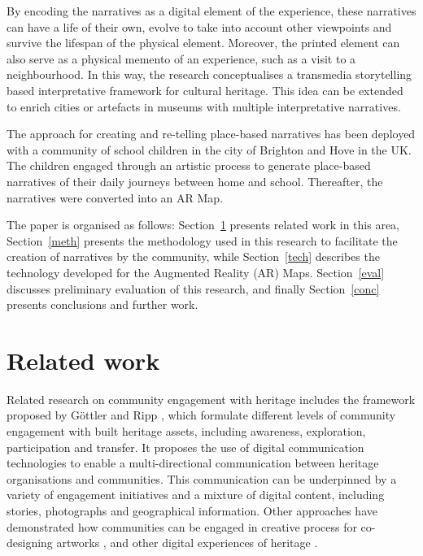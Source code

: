 \documentclass{egpubl}
\begin{document}
By encoding the narratives as a digital element of the experience, these
narratives can have a life of their own, evolve to take into account other
viewpoints and survive the lifespan of the physical element. Moreover, the
printed element can also serve as a physical memento of an experience, such as
a visit to a neighbourhood. In this way, the research conceptualises a
transmedia storytelling based interpretative framework for cultural heritage.
This idea can be extended to enrich cities or artefacts in museums with
multiple interpretative narratives.

The approach for creating and re-telling place-based narratives has been
deployed with a community of school children in the city of Brighton and Hove
in the UK. The children engaged through an artistic process to generate
place-based narratives of their daily journeys between home and school.
Thereafter, the narratives were converted into an AR Map.

The paper is organised as follows: Section~\ref{ref} presents related work in
this area, Section~\ref{meth} presents the methodology used in this research
to facilitate the creation of narratives by the community, while
Section~\ref{tech} describes the technology developed for the Augmented
Reality (AR) Maps. Section~\ref{eval} discusses preliminary evaluation of this
research, and finally Section~\ref{conc} presents conclusions and further
work.


\section{Related work} \label{ref} Related research on community engagement
with heritage includes the framework proposed by G{\"o}ttler and Ripp
\cite{icomos1812}, which formulate different levels of community engagement
with built heritage assets, including awareness, exploration, participation
and transfer. It proposes the use of digital communication technologies to
enable a multi-directional communication between heritage organisations and
communities. This communication can be underpinned by a variety of engagement
initiatives and a mixture of digital content, including stories, photographs
and geographical information. Other approaches have demonstrated how
communities can be engaged in creative process for co-designing artworks
\cite{656aab9e240d4479bf2872665a590233}, and other digital experiences of
heritage \cite{ Avram:2019:CGL:3358680.3348793, Fox:2014:CHS:2598510.2598563,
Albouys-Perrois:2018:TMA:3173574.3174203}. 
\end{document}
